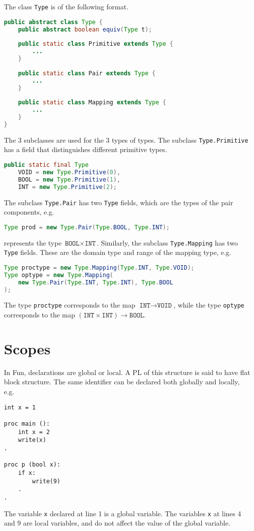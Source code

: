 \documentclass[a4paper, openany]{memoir}
\begin{document}
The class \texttt{Type} is of the following format.
\begin{lstlisting}[language=java]
public abstract class Type {
    public abstract boolean equiv(Type t);
    
    public static class Primitive extends Type {
        ...
    }
    
    public static class Pair extends Type {
        ...
    }
    
    public static class Mapping extends Type {
        ...
    }
}
\end{lstlisting}
The 3 subclasses are used for the 3 types of types. The subclass \texttt{Type.Primitive} has a field that distinguishes different primitive types.
\begin{lstlisting}[language=java]
public static final Type 
    VOID = new Type.Primitive(0),
    BOOL = new Type.Primitive(1),
    INT = new Type.Primitive(2);
\end{lstlisting}
The subclass \texttt{Type.Pair} has two \texttt{Type} fields, which are the types of the pair components, e.g.
\begin{lstlisting}[language=java]
Type prod = new Type.Pair(Type.BOOL, Type.INT);
\end{lstlisting}
represents the type $\texttt{BOOL} \times \texttt{INT}$. Similarly, the subclass \texttt{Type.Mapping} has two \texttt{Type} fields. These are the domain type and range of the mapping type, e.g.
\begin{lstlisting}[language=java]
Type proctype = new Type.Mapping(Type.INT, Type.VOID);
Type optype = new Type.Mapping(
    new Type.Pair(Type.INT, Type.INT), Type.BOOL
);
\end{lstlisting}
The type \texttt{proctype} corresponds to the map $\texttt{INT} \to \texttt{VOID}$, while the type \texttt{optype} corresponds to the map $(\texttt{INT} \times \texttt{INT}) \to \texttt{BOOL}$.

\section{Scopes}
In Fun, declarations are global or local. A PL of this structure is said to have flat block structure. The same identifier can be declared both globally and locally, e.g.
\begin{lstlisting}[language=fun]
int x = 1

proc main ():
    int x = 2
    write(x)
.

proc p (bool x):
    if x:
        write(9)
    .
.
\end{lstlisting}
The variable \texttt{x} declared at line 1 is a global variable. The variables \texttt{x} at lines 4 and 9 are local variables, and do not affect the value of the global variable.
\end{document}
